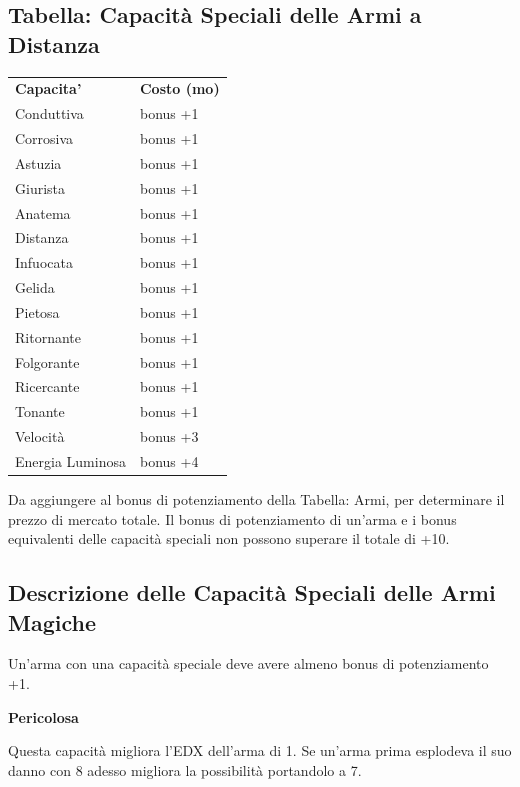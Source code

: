 \documentclass[a4paper,11pt,twoside,openany]{book}
\begin{document}
\subsection{Tabella: Capacità Speciali delle Armi a Distanza}

\label{tabella-capacita-speciali-delle-armi-a-distanza}

\begin{tabular}{ll}
	\toprule
	\textbf{Capacita'}                       & \textbf{Costo (mo)}\tabularnewline
	Conduttiva \index{Conduttiva}            & bonus +1\tabularnewline
	Corrosiva\index{Corrosiva}               & bonus +1\tabularnewline
	Astuzia \index{Astuzia}                  & bonus +1\tabularnewline
	Giurista\index{Giurista}                 & bonus +1\tabularnewline
	Anatema \index{Anatema}                  & bonus +1\tabularnewline
	Distanza\index{Distanza}                 & bonus +1\tabularnewline
	Infuocata\index{Infuocata}               & bonus +1\tabularnewline
	Gelida \index{Gelida}                    & bonus +1\tabularnewline
	Pietosa \index{Pietosa}                  & bonus +1\tabularnewline
	Ritornante \index{Ritornante}            & bonus +1\tabularnewline
	Folgorante\index{Folgorante}             & bonus +1\tabularnewline
	Ricercante \index{Ricercante}            & bonus +1\tabularnewline
	Tonante \index{Tonante}                  & bonus +1\tabularnewline
	Velocità \index{Velocita'}               & bonus +3\tabularnewline
	Energia Luminosa\index{Energia Luminosa} & bonus +4\tabularnewline
\end{tabular}

\bigskip

Da aggiungere al bonus di potenziamento della Tabella: Armi, per determinare
il prezzo di mercato totale. Il bonus di potenziamento di un'arma
e i bonus equivalenti delle capacità speciali non possono superare
il totale di +10.

\subsection{Descrizione delle Capacità Speciali delle Armi Magiche}

\label{descrizione-delle-capacita-speciali-delle-armi-magiche}

Un'arma con una capacità speciale deve avere almeno bonus di potenziamento +1.

\textbf{Pericolosa}

Questa capacità migliora l'EDX dell'arma di 1. Se un'arma prima esplodeva il suo danno con 8 adesso migliora la possibilità portandolo a 7.
\end{document}

